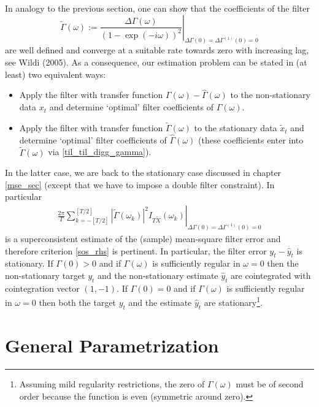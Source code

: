 \documentclass[a4paper]{book}
\begin{document}
In analogy to the previous section, one can show that the coefficients of the filter 
\begin{equation}\label{til_til_digg_gamma}
\left.\tilde{\Gamma}(\omega):=\displaystyle{\frac{\Delta\Gamma(\omega) }{(1-\exp(-i\omega))^2}}\right|_{\Delta\Gamma(0)=\Delta\Gamma^{(1)}(0)=0}
\end{equation} 
are well defined and converge at a suitable rate towards zero with increasing lag, see Wildi (2005). As a consequence,  our estimation problem can be stated in (at least) two equivalent ways:
\begin{itemize}
\item Apply the filter with transfer function $\Gamma(\omega)-\hat{\Gamma}(\omega)$ to the non-stationary data $x_t$ and determine `optimal' filter coefficients of $\hat{\Gamma}(\omega)$.
\item Apply the filter with transfer function $\tilde{\Gamma}(\omega)$ to the stationary data $\tilde{x}_t$ and determine `optimal' filter coefficients of $\hat{\Gamma}(\omega)$ (these coefficients enter into $\tilde{\Gamma}(\omega)$ via \ref{til_til_digg_gamma}).  
\end{itemize}
In the latter case, we are back to the stationary case discussed in chapter \ref{mse_sec} (except that we have to impose a double filter constraint). In particular
\begin{eqnarray*}
\left.\frac{2\pi}{T}\sum_{k=-[T/2]}^{[T/2]}\left|\tilde{\Gamma}(\omega_k) \right|^2I_{T\tilde{X}}(\omega_k)\right|_{\Delta\Gamma(0)=\Delta\Gamma^{(1)}(0)=0}
\end{eqnarray*}
is a superconsistent estimate of the (sample) mean-square filter error and therefore criterion \ref{sos_rhs} is pertinent. In particular, the filter error $y_t-\hat{y}_t$ is stationary. If $\Gamma(0)>0$ and if $\Gamma(\omega)$ is sufficiently regular in $\omega=0$ then the non-stationary target $y_t$ and the non-stationary estimate $\hat{y}_t$ are cointegrated with cointegration vector $(1,-1)$. If $\Gamma(0)=0$ and if $\Gamma(\omega)$ is sufficiently regular in $\omega=0$ then both the target $y_t$ and the estimate $\hat{y}_t$ are stationary\footnote{Assuming mild regularity restrictions, the zero of $\Gamma(\omega)$ must be of second order because the function is even (symmetric around zero).}.  


\section{General Parametrization}\label{cons_gen_par}
\end{document}
